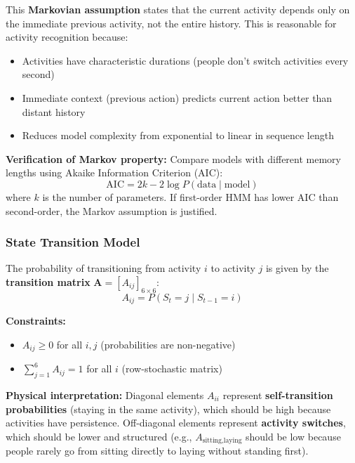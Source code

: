 \documentclass[11pt,a4paper]{article}
\newcommand{\bA}{\mathbf{A}}
\begin{document}
This \textbf{Markovian assumption} states that the current activity depends only on the immediate previous activity, not the entire history. This is reasonable for activity recognition because:
\begin{itemize}[leftmargin=*]
    \item Activities have characteristic durations (people don't switch activities every second)
    \item Immediate context (previous action) predicts current action better than distant history
    \item Reduces model complexity from exponential to linear in sequence length
\end{itemize}

\textbf{Verification of Markov property:} Compare models with different memory lengths using Akaike Information Criterion (AIC):
\begin{equation}
\text{AIC} = 2k - 2\log P(\text{data} \mid \text{model})
\end{equation}
where $k$ is the number of parameters. If first-order HMM has lower AIC than second-order, the Markov assumption is justified.

\subsubsection{State Transition Model}

The probability of transitioning from activity $i$ to activity $j$ is given by the \textbf{transition matrix} $\bA = [A_{ij}]_{6 \times 6}$:
\begin{equation}
A_{ij} = P(S_t = j \mid S_{t-1} = i)
\end{equation}

\textbf{Constraints:}
\begin{itemize}[leftmargin=*]
    \item $A_{ij} \geq 0$ for all $i, j$ (probabilities are non-negative)
    \item $\sum_{j=1}^{6} A_{ij} = 1$ for all $i$ (row-stochastic matrix)
\end{itemize}

\textbf{Physical interpretation:} Diagonal elements $A_{ii}$ represent \textbf{self-transition probabilities} (staying in the same activity), which should be high because activities have persistence. Off-diagonal elements represent \textbf{activity switches}, which should be lower and structured (e.g., $A_{\text{sitting}, \text{laying}}$ should be low because people rarely go from sitting directly to laying without standing first).
\end{document}
